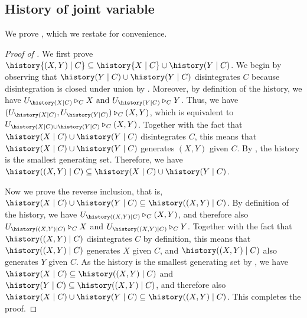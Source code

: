 \documentclass[USenglish,onecolumn]{article}
\begin{document}
\subsection{History of joint variable}
\label{sec:proofjointhistory}
We prove , which we restate for convenience.

\jointhistory*
\begin{proof}[Proof of ]
     We first prove $\history{(X,Y) \given C}\subseteq\history{X \given C}\cup \history(Y\given C)$. We begin by observing that $\history(Y\given C)\cup \history(Y\given C)$ disintegrates $C$ because disintegration is closed under union by .
     Moreover, by definition of the history, we have
     \(U_{\history(X\given C)}\functionTo_C X \textnormal{ and } U_{\history(Y\given C)}\functionTo_C Y\).
     Thus, we have
     \((U_{\history(X\given C)}, U_{\history(Y\given C)})\functionTo_C (X,Y)\),
     which is equivalent to
     \(U_{\history(X\given C)\cup\history(Y\given C)}\functionTo_C (X,Y)\).
     Together with the fact that $\history(X\given C)\cup \history(Y\given C)$ disintegrates $C$,
     this means that $\history(X\given C)\cup\history(Y\given C)$ generates $(X,Y)$ given $C$. By , the history is the smallest generating set. Therefore, we have
     $\history((X,Y)\given C) \subseteq \history(X\given C)\cup \history(Y\given C)$.

     Now we prove the reverse inclusion, that is, $\history(X\given C)\cup \history(Y\given C)\subseteq \history((X,Y)\given C)$.
     By definition of the history, we have
     \(U_{\history((X,Y)\given C)}\functionTo_C (X,Y)\),
     and therefore also
     \(U_{\history((X,Y)\given C)}\functionTo_C X\)
     and
     \(U_{\history((X,Y)\given C)}\functionTo_C Y\).
     Together with the fact that $\history((X,Y)\given C)$ disintegrates $C$
     by definition, this means that $\history((X,Y)\given C)$ generates $X$ given $C$, and $\history((X,Y)\given C)$ also generates $Y$ given $C$. As the history is the smallest generating set by , we have
     \(\history(X\given C) \subseteq \history((X,Y)\given C)\) and $\history(Y\given C) \subseteq \history((X,Y)\given C)$,
     and therefore also
     $\history(X\given C)\cup \history(Y\given C) \subseteq \history((X,Y)\given C)$.
     This completes the proof.
\end{proof}
\end{document}
